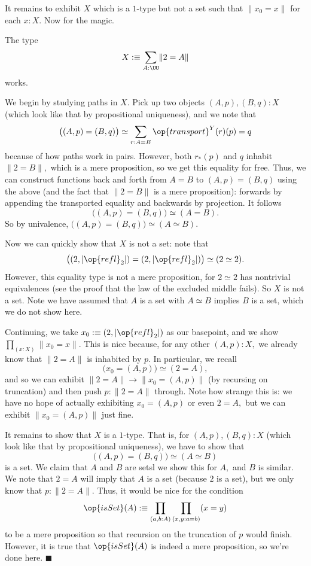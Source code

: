 It remains to exhibit $X$ which is a $1$-type but not a set such that $\lVert x_0=x\rVert$ for each $x:X.$ Now for the magic.
\begin{lemma}
    The type
    \[X:\equiv\sum_{A:\UU}\lVert2=A\rVert\]
    works.
\end{lemma}
We begin by studying paths in $X.$ Pick up two objects $(A,p),(B,q):X$ (which look like that by propositional uniqueness), and we note that
\[\big((A,p)=(B,q)\big)\simeq\sum_{r:A=B}\op{transport}^{Y}(r)(p)=q\]
because of how paths work in pairs. However, both $r_*(p)$ and $q$ inhabit $\lVert2=B\rVert,$ which is a mere proposition, so we get this equality for free. Thus, we can construct functions back and forth from $A=B$ to $(A,p)=(B,q)$ using the above (and the fact that $\lVert2=B\rVert$ is a mere proposition): forwards by appending the transported equality and backwards by projection. It follows
\[\big((A,p)=(B,q)\big)\simeq(A=B).\]
So by univalence, $\big((A,p)=(B,q)\big)\simeq(A\simeq B).$

Now we can quickly show that $X$ is not a set: note that
\[\big((2,|\op{refl}_2|)=(2,|\op{refl}_2|)\big)\simeq(2\simeq2).\]
However, this equality type is not a mere proposition, for $2\simeq2$ has nontrivial equivalences (see the proof that the law of the excluded middle fails). So $X$ is not a set. Note we have assumed that $A$ is a set with $A\simeq B$ implies $B$ is a set, which we do not show here.

Continuing, we take $x_0:\equiv(2,|\op{refl}_2|)$ as our basepoint, and we show $\prod_{(x:X)}\lVert x_0=x\rVert.$ This is nice because, for any other $(A,p):X,$ we already know that $\lVert2=A\rVert$ is inhabited by $p.$ In particular, we recall
\[\big(x_0=(A,p)\big)\simeq(2=A),\]
and so we can exhibit $\lVert2=A\rVert\to\lVert x_0=(A,p)\rVert$ (by recursing on truncation) and then push $p:\lVert2=A\rVert$ through. Note how strange this is: we have no hope of actually exhibiting $x_0=(A,p)$ or even $2=A,$ but we can exhibit $\lVert x_0=(A,p)\rVert$ just fine.

It remains to show that $X$ is a $1$-type. That is, for $(A,p),(B,q):X$ (which look like that by propositional uniqueness), we have to show that
\[\big((A,p)=(B,q)\big)\simeq(A\simeq B)\]
is a set. We claim that $A$ and $B$ are setsl we show this for $A,$ and $B$ is similar. We note that $2=A$ will imply that $A$ is a set (because $2$ is a set), but we only know that $p:\lVert2=A\rVert.$ Thus, it would be nice for the condition
\[\op{isSet}(A):\equiv\prod_{(a,b:A)}\prod_{(x,y:a=b)}(x=y)\]
to be a mere proposition so that recursion on the truncation of $p$ would finish. However, it is true that $\op{isSet}(A)$ is indeed a mere proposition, so we're done here. $\blacksquare$

